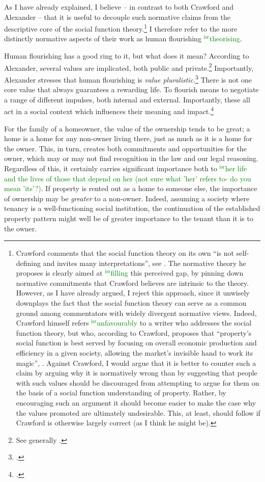 \documentclass[12pt,a4paper]{book} %
\newcommand{\isr}[1]{\textcolor{green}{$^{\textrm{isr}}${#1}}}
\begin{document}
As I have already explained, I believe -- in contrast to both Crawford and Alexander -- that it is useful to decouple such normative claims from the descriptive core of the social function theory.\footnote{Crawford comments that the social function theory on its own  ``is not self-defining and invites many interpretations'', see \cite[1089]{crawford11}. The normative theory he proposes is clearly aimed at \isr{filling} this perceived gap, by pinning down normative commitments that Crawford believes are intrinsic to the theory. However, as I have already argued, I reject this approach, since it unwisely downplays the fact that the social function theory can serve as a common ground among commentators with widely divergent normative views. Indeed, Crawford himself refers \isr{unfavourably} to a writer who addresses the social function theory, but who, according to Crawford, proposes that ``property's social function is best served by focusing on overall economic production and efficiency in a given society, allowing the market's invisible hand to work its magic'', \cite[see][1089]{crawford11}. Against Crawford, I would argue that it is better to counter such a claim by arguing why it is normatively wrong than by suggesting that people with such values should be discouraged from attempting to argue for them on the basis of a social function understanding of property. Rather, by encouraging such an argument it should become easier to make the case why the values promoted are ultimately undesirable. This, at least, should follow if Crawford is otherwise largely correct (as I think he might be).} I therefore refer to the more distinctly normative aspects of their work as human flourishing \isr{theorising}. 

Human flourishing has a good ring to it, but what does it mean? According to Alexander, several values are implicated, both public and private.\footnote{See generally \cite{alexander14,alexander11}.} Importantly, Alexander stresses that human flourishing is {\it value pluralistic}.\footnote{\cite[750-751]{alexander09}.} There is not one core value that always guarantees a rewarding life. To flourish means to negotiate a range of different impulses, both internal and external. Importantly, these all act in a social context which influences their meaning and impact.\footcite[1035-1052]{alexander11}

For the family of a homeowner, the value of the ownership tends to be great; a home is a home for any non-owner living there, just as much as it is a home for the owner. This, in turn, creates both commitments and opportunities for the owner, which may or may not find recognition in the law and our legal reasoning. Regardless of this, it certainly carries significant importance both to \isr{her life and the lives of those that depend on her (not sure what 'her' refers to- do you mean 'its'?)}. If property is rented out as a home to someone else, the importance of ownership may be {\it greater} to a non-owner. Indeed, assuming a society where tenancy is a well-functioning social institution, the continuation of the established property pattern might well be of greater importance to the tenant than it is to the owner.
\end{document}

